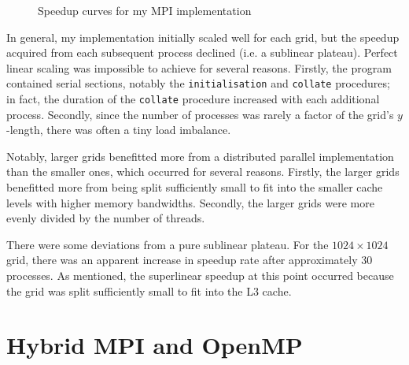 \documentclass[twocolumn, a4paper]{article}
\begin{document}
\begin{figure}[htpb]
{
  }
  \caption{Speedup curves for my MPI implementation}\label{fig:scaling}
\end{figure}

In general, my implementation initially scaled well for each grid, but the speedup acquired from each subsequent process declined (i.e. a sublinear plateau).
Perfect linear scaling was impossible to achieve for several reasons.
Firstly, the program contained serial sections, notably the \texttt{initialisation} and \texttt{collate} procedures; in fact, the duration of the \texttt{collate} procedure increased with each additional process.
Secondly, since the number of processes was rarely a factor of the grid's $y$-length, there was often a tiny load imbalance.

Notably, larger grids benefitted more from a distributed parallel implementation than the smaller ones, which occurred for several reasons.
Firstly, the larger grids benefitted more from being split sufficiently small to fit into the smaller cache levels with higher memory bandwidths.
Secondly, the larger grids were more evenly divided by the number of threads.

There were some deviations from a pure sublinear plateau.
For the $1024\times1024$ grid, there was an apparent increase in speedup rate after approximately 30 processes.
As mentioned, the superlinear speedup at this point occurred because the grid was split sufficiently small to fit into the L3 cache.

\section{Hybrid MPI and OpenMP}
\end{document}
